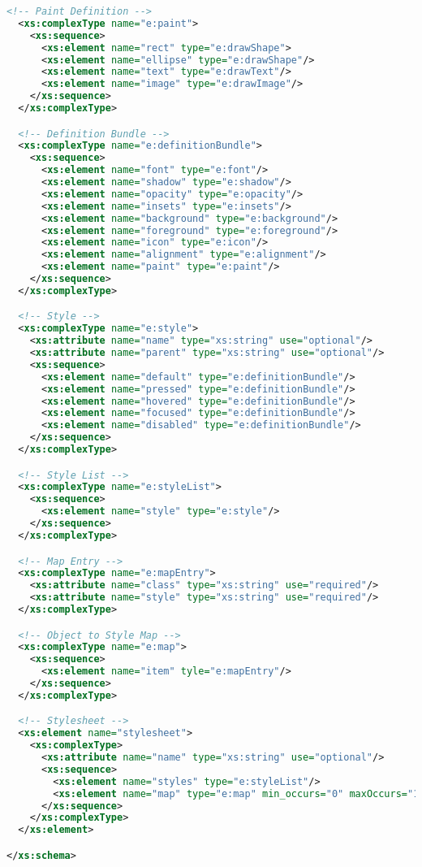 \begin{lstlisting}[language=XML]
  <!-- Paint Definition -->
  <xs:complexType name="e:paint">
    <xs:sequence>
      <xs:element name="rect" type="e:drawShape">
      <xs:element name="ellipse" type="e:drawShape"/>
      <xs:element name="text" type="e:drawText"/>
      <xs:element name="image" type="e:drawImage"/>
    </xs:sequence>
  </xs:complexType>

  <!-- Definition Bundle -->
  <xs:complexType name="e:definitionBundle">
    <xs:sequence>
      <xs:element name="font" type="e:font"/>
      <xs:element name="shadow" type="e:shadow"/>
      <xs:element name="opacity" type="e:opacity"/>
      <xs:element name="insets" type="e:insets"/>
      <xs:element name="background" type="e:background"/>
      <xs:element name="foreground" type="e:foreground"/>
      <xs:element name="icon" type="e:icon"/>
      <xs:element name="alignment" type="e:alignment"/>
      <xs:element name="paint" type="e:paint"/>
    </xs:sequence>
  </xs:complexType>

  <!-- Style -->
  <xs:complexType name="e:style">
    <xs:attribute name="name" type="xs:string" use="optional"/>
    <xs:attribute name="parent" type="xs:string" use="optional"/>
    <xs:sequence>
      <xs:element name="default" type="e:definitionBundle"/>
      <xs:element name="pressed" type="e:definitionBundle"/>
      <xs:element name="hovered" type="e:definitionBundle"/>
      <xs:element name="focused" type="e:definitionBundle"/>
      <xs:element name="disabled" type="e:definitionBundle"/>
    </xs:sequence>
  </xs:complexType>

  <!-- Style List -->
  <xs:complexType name="e:styleList">
    <xs:sequence>
      <xs:element name="style" type="e:style"/>
    </xs:sequence>
  </xs:complexType>

  <!-- Map Entry -->
  <xs:complexType name="e:mapEntry">
    <xs:attribute name="class" type="xs:string" use="required"/>
    <xs:attribute name="style" type="xs:string" use="required"/>
  </xs:complexType>

  <!-- Object to Style Map -->
  <xs:complexType name="e:map">
    <xs:sequence>
      <xs:element name="item" tyle="e:mapEntry"/>
    </xs:sequence>
  </xs:complexType>

  <!-- Stylesheet -->
  <xs:element name="stylesheet">
    <xs:complexType>
      <xs:attribute name="name" type="xs:string" use="optional"/>
      <xs:sequence>
        <xs:element name="styles" type="e:styleList"/>
        <xs:element name="map" type="e:map" min_occurs="0" maxOccurs="1"/>
      </xs:sequence>
    </xs:complexType>
  </xs:element>

</xs:schema>
\end{lstlisting}